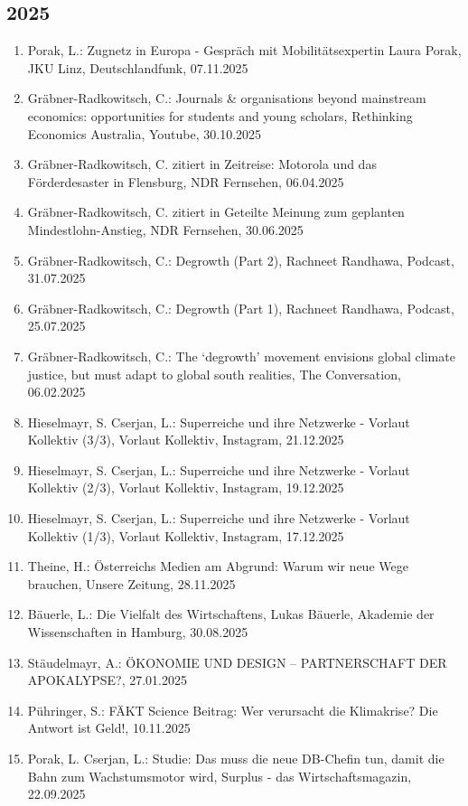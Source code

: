 \subsection*{2025}
\begin{enumerate}
	 \item Porak, L.: Zugnetz in Europa - Gespräch mit Mobilitätsexpertin Laura Porak, JKU Linz, Deutschlandfunk, 07.11.2025
	 \item Gräbner-Radkowitsch, C.: Journals & organisations beyond mainstream economics: opportunities for students and young scholars, Rethinking Economics Australia, Youtube, 30.10.2025
	 \item Gräbner-Radkowitsch, C. zitiert in Zeitreise: Motorola und das Förderdesaster in Flensburg, NDR Fernsehen, 06.04.2025
	 \item Gräbner-Radkowitsch, C. zitiert in Geteilte Meinung zum geplanten Mindestlohn-Anstieg, NDR Fernsehen, 30.06.2025
	 \item Gräbner-Radkowitsch, C.: Degrowth (Part 2), Rachneet Randhawa, Podcast, 31.07.2025
	 \item Gräbner-Radkowitsch, C.: Degrowth (Part 1), Rachneet Randhawa, Podcast, 25.07.2025
	 \item Gräbner-Radkowitsch, C.: The ‘degrowth’ movement envisions global climate justice, but must adapt to global south realities, The Conversation, 06.02.2025
	 \item Hieselmayr, S. Cserjan, L.: Superreiche und ihre Netzwerke - Vorlaut Kollektiv (3/3), Vorlaut Kollektiv, Instagram, 21.12.2025
	 \item Hieselmayr, S. Cserjan, L.: Superreiche und ihre Netzwerke - Vorlaut Kollektiv (2/3), Vorlaut Kollektiv, Instagram, 19.12.2025
	 \item Hieselmayr, S. Cserjan, L.: Superreiche und ihre Netzwerke - Vorlaut Kollektiv (1/3), Vorlaut Kollektiv, Instagram, 17.12.2025
	 \item Theine, H.: Österreichs Medien am Abgrund: Warum wir neue Wege brauchen, Unsere Zeitung, 28.11.2025
	 \item Bäuerle, L.: Die Vielfalt des Wirtschaftens, Lukas Bäuerle, Akademie der Wissenschaften in Hamburg, 30.08.2025
	 \item Stäudelmayr, A.: ÖKONOMIE UND DESIGN – PARTNERSCHAFT DER APOKALYPSE?, 27.01.2025
	 \item Pühringer, S.: FÄKT Science Beitrag: Wer verursacht die Klimakrise? Die Antwort ist Geld!, 10.11.2025
	 \item Porak, L. Cserjan, L.: Studie: Das muss die neue DB-Chefin tun, damit die Bahn zum Wachstumsmotor wird, Surplus - das Wirtschaftsmagazin, 22.09.2025

\end{enumerate}
